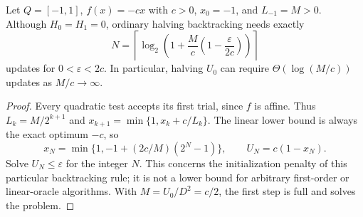 \begin{proposition}\label{prop:initialization}
Let $Q=[-1,1]$, $f(x)=-cx$ with $c>0$, $x_0=-1$, and $L_{-1}=M>0$.
Although $H_0=H_1=0$, ordinary halving backtracking needs exactly
\[
 N=\left\lceil\log_2\left(1+\frac Mc
                  \left(1-\frac{\varepsilon}{2c}\right)\right)\right\rceil
\]
updates for $0<\varepsilon<2c$. In particular, halving $U_0$ can require
$\Theta(\log(M/c))$ updates as $M/c\to\infty$.
\end{proposition}
\begin{proof}
Every quadratic test accepts its first trial, since $f$ is affine.
Thus $L_k=M/2^{k+1}$ and
$x_{k+1}=\min\{1,x_k+c/L_k\}$. The linear lower bound is always the
exact optimum $-c$, so
\[
 x_N=\min\{1,-1+(2c/M)(2^N-1)\},\qquad U_N=c(1-x_N).
\]
Solve $U_N\le\varepsilon$ for the integer $N$. This concerns the
initialization penalty of this particular backtracking rule; it is not
a lower bound for arbitrary first-order or linear-oracle algorithms.
With $M=U_0/D^2=c/2$, the first step is full and solves the problem.
\end{proof}
